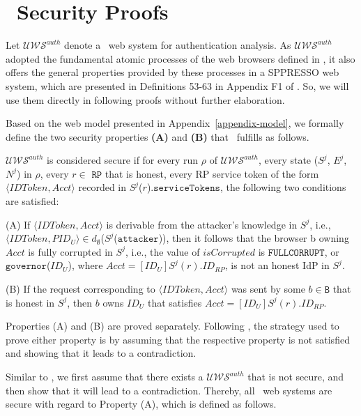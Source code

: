 \section{\usso\ Security Proofs}
\label{appendix-security}

Let  $\mathcal{UWS}^{auth}$ denote a \usso\ web system for authentication analysis. As $\mathcal{UWS}^{auth}$ adopted the fundamental atomic processes of the web browsers defined in \cite{SPRESSO}, it also offers the general properties provided by these processes in a SPPRESSO web system, which are presented in Definitions 53-63 in Appendix F1 of \cite{SPRESSO}. So, we will use them directly in following proofs without further elaboration.

Based on the web model presented in Appendix~\ref{appendix-model}, we formally define the two security properties {\bf (A)} and {\bf (B)} that \usso\ fulfills as follows. 

\begin{definition}
$\mathcal{UWS}^{auth}$ is considered secure if for every run $\rho$ of $\mathcal{UWS}^{auth}$, every state ($S^j$, $E^j$, $N^j$) in $\rho$, every $r \in$ $\mathtt{RP}$ that is honest, every RP service token of the form $\langle IDToken, Acct \rangle$ recorded in $S^j$($r$).$\mathtt{serviceTokens}$, the following two conditions are satisfied:

(A) If $\langle IDToken, Acct\rangle$ is derivable from the attacker's knowledge in $S^j$, i.e., $\langle IDToken, PID_U \rangle \in d_{\emptyset}$($S^j$($\mathtt{attacker}$)), then it follows that the browser b owning $Acct$ is fully corrupted in $S^j$, i.e., the value of $isCorrupted$ is $\mathtt{FULLCORRUPT}$, or $\mathtt{governor}$($ID_U$), where $Acct=[ID_U]S^j(r).ID_{RP}$, is not an honest IdP in $S^j$.

(B) If the request corresponding to $\langle IDToken, Acct \rangle$ was sent by some $b \in \mathtt{B}$ that is honest in $S^j$, then $b$ owns $ID_U$ that satisfies $Acct=[ID_U]S^j(r).ID_{RP}$.
\end{definition}

Properties (A) and (B) are proved separately. Following \cite{SPRESSO}, the strategy used to prove either property is by assuming that the respective property is not satisfied and showing that it leads to a contradiction.

\vspace{1mm} 
Similar to \cite{SPRESSO}, we first assume that there exists a $\mathcal{UWS}^{auth}$ that is not secure, and then show that it will lead to a contradiction. Thereby, all \usso\ web systems are secure with regard to Property (A), which is defined as follows.

